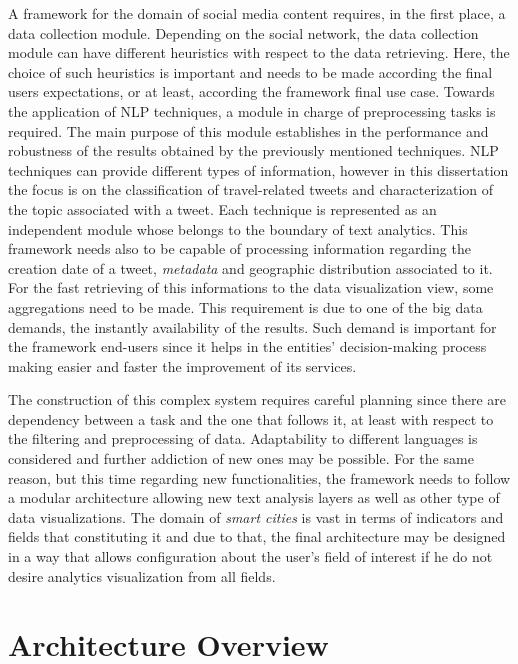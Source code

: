 A framework for the domain of social media content requires, in the first place, a data collection module. Depending on the social network, the data collection module can have different heuristics with respect to the data retrieving. Here, the choice of such heuristics is important and needs to be made according the final users expectations, or at least, according the framework final use case. Towards the application of \gls{NLP} techniques, a module in charge of preprocessing tasks is required. The main purpose of this module establishes in the performance and robustness of the results obtained by the previously mentioned techniques. \gls{NLP} techniques can provide different types of information, however in this dissertation the focus is on the classification of travel-related tweets and characterization of the topic associated with a tweet. Each technique is represented as an independent module whose belongs to the boundary of text analytics. This framework needs also to be capable of processing information regarding the creation date of a tweet, \textit{metadata} and geographic distribution associated to it. For the fast retrieving of this informations to the data visualization view, some aggregations need to be made. This requirement is due to one of the big data demands, the instantly availability of the results. Such demand is important for the framework end-users since it helps in the entities' decision-making process making easier and faster the improvement of its services.

The construction of this complex system requires careful planning since there are dependency between a task and the one that follows it, at least with respect to the filtering and preprocessing of data. Adaptability to different languages is considered and further addiction of new ones may be possible. For the same reason, but this time regarding new functionalities, the framework needs to follow a modular architecture allowing new text analysis layers as well as other type of data visualizations. The domain of \textit{smart cities} is vast in terms of indicators and fields that constituting it and due to that, the final architecture may be designed in a way that allows configuration about the user's field of interest if he do not desire analytics visualization from all fields.

\section{Architecture Overview}\label{sec:architecture}

